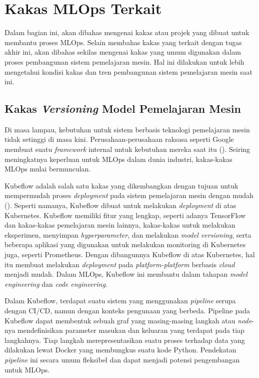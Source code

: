 \section{Kakas MLOps Terkait}

Dalam bagian ini, akan dibahas mengenai kakas atau projek yang dibuat untuk membantu proses MLOps.
Selain membahas kakas yang terkait dengan tugas akhir ini, akan dibahas sekilas mengenai kakas yang umum digunakan dalam proses pembangunan sistem pemelajaran mesin.
Hal ini dilakukan untuk lebih mengetahui kondisi kakas dan tren pembangunan sistem pemelajaran mesin saat ini.

\subsection{Kakas \textit{Versioning} Model Pemelajaran Mesin}

Di masa lampau, kebutuhan untuk sistem berbasis teknologi pemelajaran mesin tidak setinggi di masa kini. 
Perusahaan-perusahaan raksasa seperti Google membuat suatu \textit{framework} internal untuk kebutuhan mereka saat itu (\cite{mlops}).
Seiring meningkatnya keperluan untuk MLOps dalam dunia industri, kakas-kakas MLOps mulai bermunculan.

Kubeflow adalah salah satu kakas yang dikembangkan dengan tujuan untuk mempermudah proses \textit{deployment} pada sistem pemelajaran mesin dengan mudah (\cite{k8s}).
Seperti namanya, Kubeflow dibuat untuk melakukan \textit{deployment} di atas Kubernetes.
Kubeflow memiliki fitur yang lengkap, seperti adanya TensorFlow dan kakas-kakas pemelajaran mesin lainnya, kakas-kakas untuk melakukan eksperimen, menyimpan \textit{hyperparameter}, dan melakukan \textit{model versioning}, serta beberapa aplikasi yang digunakan untuk melakukan monitoring di Kubernetes juga, seperti Prometheus.
Dengan dibangunnya Kubeflow di atas Kubernetes, hal itu membuat melakukan \textit{deployment} pada \textit{platform-platform} berbasis \textit{cloud} menjadi mudah.
Dalam MLOps, Kubeflow ini membantu dalam tahapan \textit{model engineering} dan \textit{code engineering}.

Dalam Kubeflow, terdapat suatu sistem yang menggunakan \textit{pipeline} serupa dengan CI/CD, namun dengan konteks pengunaan yang berbeda.
Pipeline pada Kubeflow dapat membentuk sebuah graf yang masing-masing langkah atau \textit{node}-nya mendefinisikan parameter masukan dan keluaran yang terdapat pada tiap langkahnya.
Tiap langkah merepresentasikan suatu proses terhadap data yang dilakukan lewat Docker yang membungkus suatu kode Python.
Pendekatan \textit{pipeline} ini secara umum fleksibel dan dapat menjadi potensi pengembangan untuk MLOps.

